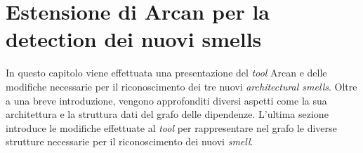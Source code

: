 \section{Estensione di Arcan per la detection dei nuovi smells}
    In questo capitolo viene effettuata una presentazione del \textit{tool} Arcan e delle modifiche necessarie per il riconoscimento dei tre nuovi \textit{architectural smells}. Oltre a una breve introduzione, vengono approfonditi diversi aspetti come la sua architettura e la struttura dati del grafo delle dipendenze. L'ultima sezione introduce le modifiche effettuate al \textit{tool} per rappresentare nel grafo le diverse strutture necessarie per il riconoscimento dei nuovi \textit{smell}.
    
